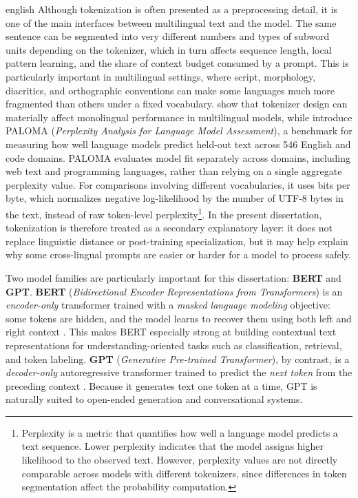 \begin{otherlanguage*}{english}
Although tokenization is often presented as a preprocessing detail, it is one of the main interfaces between multilingual text and the model. The same sentence can be segmented into very different numbers and types of subword units depending on the tokenizer, which in turn affects sequence length, local pattern learning, and the share of context budget consumed by a prompt. This is particularly important in multilingual settings, where script, morphology, diacritics, and orthographic conventions can make some languages much more fragmented than others under a fixed vocabulary. \textcite{rust2021tokenizer} show that tokenizer design can materially affect monolingual performance in multilingual models, while \textcite{magnusson2023paloma} introduce PALOMA (\emph{Perplexity Analysis for Language Model Assessment}), a benchmark for measuring how well language models predict held-out text across 546 English and code domains. PALOMA evaluates model fit separately across domains, including web text and programming languages, rather than relying on a single aggregate perplexity value. For comparisons involving different vocabularies, it uses bits per byte, which normalizes negative log-likelihood by the number of UTF-8 bytes in the text, instead of raw token-level perplexity\footnote{Perplexity is a metric that quantifies how well a language model predicts a text sequence. Lower perplexity indicates that the model assigns higher likelihood to the observed text. However, perplexity values are not directly comparable across models with different tokenizers, since differences in token segmentation affect the probability computation.}. In the present dissertation, tokenization is therefore treated as a secondary explanatory layer: it does not replace linguistic distance or post-training specialization, but it may help explain why some cross-lingual prompts are easier or harder for a model to process safely.

Two model families are particularly important for this dissertation: \textbf{BERT} and \textbf{GPT}. \textbf{BERT} (\emph{Bidirectional Encoder Representations from Transformers}) is an \emph{encoder-only} transformer trained with a \emph{masked language modeling} objective: some tokens are hidden, and the model learns to recover them using both left and right context \cite{devlinBERTPretrainingDeep2019}. This makes BERT especially strong at building contextual text representations for understanding-oriented tasks such as classification, retrieval, and token labeling. \textbf{GPT} (\emph{Generative Pre-trained Transformer}), by contrast, is a \emph{decoder-only} autoregressive transformer trained to predict the \emph{next token} from the preceding context \cite{radfordLanguageModelsAre}. Because it generates text one token at a time, GPT is naturally suited to open-ended generation and conversational systems.


\end{otherlanguage*}
